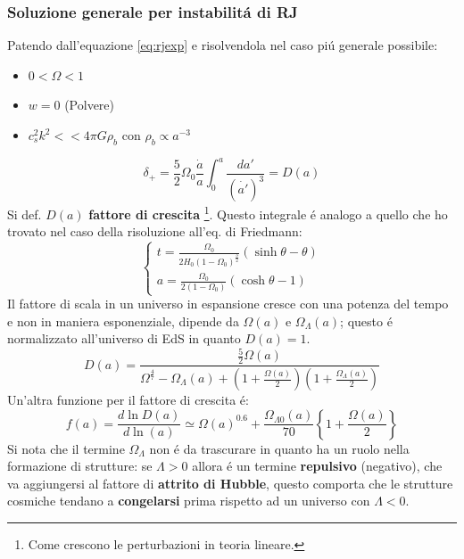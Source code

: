 \documentclass[12pt, a4paper]{article}
\begin{document}
\subsubsection{Soluzione generale per instabilit\'{a} di RJ}
Patendo dall'equazione \ref{eq:rjexp} e risolvendola nel caso pi\'{u} generale possibile:
\begin{itemize}
\item $0<\Omega<1$
\item $w=0$ (Polvere)
\item $c_s^2k^2<<4\pi G\rho_b$ con $\rho_{b}\propto a^{-3}$
\end{itemize}
\begin{equation}
\delta_+=\frac{5}{2} \Omega_0 \frac{\dot{a}}{a}\int_0^a \frac{da'}{(\dot{a'})^3}=D(a)
\end{equation}
Si def. $D(a)$ \textbf{fattore di crescita} \footnote{Come crescono le perturbazioni in teoria lineare.}. Questo integrale \'{e} analogo a quello che ho trovato nel caso della risoluzione all'eq. di Friedmann:
\begin{equation}
\begin{cases}
t=\frac{\Omega_0}{2H_0(1-\Omega_0)^{\frac{3}{2}}}(\sinh{\theta}-\theta)
\\
a=\frac{\Omega_0}{2(1-\Omega_0)}(\cosh{\theta}-1)
\end{cases}
\end{equation}
Il fattore di scala in un universo in espansione cresce con una potenza del tempo e non in maniera esponenziale, dipende da $\Omega(a)$ e $\Omega_{\Lambda }(a)$;  questo \'{e} normalizzato all'universo di EdS in quanto  $D(a)=1$.
\begin{equation}
D(a)=\frac{\frac{5}{2}\Omega(a)}{\Omega^{\frac{4}{7}}- \Omega_{\Lambda}(a)+(1+\frac{\Omega(a)}{2})(1+\frac{\Omega_{\Lambda}(a)}{2})}
\end{equation}
Un'altra funzione per il fattore di crescita \'{e}:
\begin{equation}
f(a)=\frac{d\ln{D(a)}}{d\ln(a)}\simeq \Omega(a)^{0.6}+\frac{\Omega_{\Lambda 0}(a)}{70}\left\{1+\frac{\Omega(a)}{2}\right\}
\end{equation}
Si nota che il termine $\Omega_{\Lambda}$ non \'{e} da trascurare in quanto ha un ruolo nella formazione di strutture: se $\Lambda>0$ allora  \'{e} un termine \textbf{repulsivo} (negativo), che va aggiungersi al fattore di \textbf{attrito di Hubble}, questo comporta che le strutture cosmiche tendano a \textbf{congelarsi} prima rispetto ad un universo con $\Lambda<0$.
\end{document}
